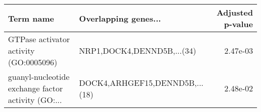 \begin{tabular}{llr}
\toprule
                                         Term name &           Overlapping genes... &  Adjusted p-value \\
\midrule
            GTPase activator activity (GO:0005096) &     NRP1,DOCK4,DENND5B,...(34) &          2.47e-03 \\
guanyl-nucleotide exchange factor activity (GO:... & DOCK4,ARHGEF15,DENND5B,...(18) &          2.48e-02 \\
\bottomrule
\end{tabular}
